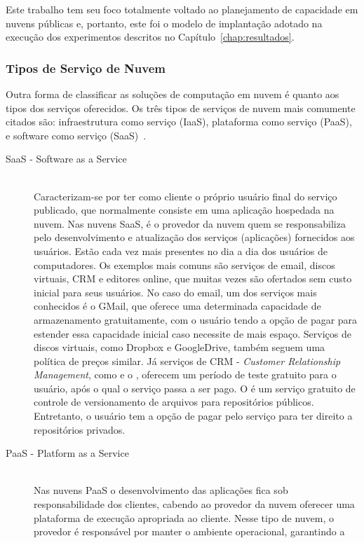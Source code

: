 Este trabalho tem seu foco totalmente voltado ao planejamento de capacidade em
nuvens públicas e, portanto, este foi o modelo de implantação adotado na execução
dos experimentos descritos no Capítulo~\ref{chap:resultados}. 

\subsubsection{Tipos de Serviço de Nuvem}
Outra forma de classificar as soluções de computação em nuvem é quanto aos tipos 
dos serviços oferecidos. Os três tipos de serviços de nuvem mais comumente citados 
são: infraestrutura como serviço (IaaS), plataforma como serviço (PaaS), e 
software como serviço (SaaS)~\cite{armbrust2010view,Zhang2010}. 

\begin{description}
\item[SaaS - Software as a Service] \hfill \\ Caracterizam-se por ter como cliente o
próprio usuário final do serviço publicado, que normalmente consiste em uma
aplicação hospedada na nuvem. Nas nuvens SaaS, é o provedor da nuvem quem se
responsabiliza pelo desenvolvimento e atualização dos serviços (aplicações) 
fornecidos aos usuários. Estão cada vez mais presentes no dia a dia dos usuários 
de computadores. Os exemplos mais comuns são serviços de email, discos virtuais, 
CRM e editores online, que muitas vezes são ofertados sem custo inicial para seus 
usuários. No caso do email, um dos serviços mais conhecidos é o GMail, que oferece 
uma determinada capacidade de armazenamento gratuitamente, com o usuário tendo a 
opção de pagar para estender essa capacidade inicial caso necessite de mais espaço. 
Serviços de discos virtuais, como Dropbox e GoogleDrive, também seguem uma política 
de preços similar. Já serviços de CRM - \emph{Customer Relationship Management}, 
como \cite{salesforce} e o \cite{zoho}, oferecem um período de teste gratuito 
para o usuário, após o qual o serviço passa a ser pago. O \cite{github} é um 
serviço gratuito de controle de versionamento de arquivos para repositórios 
públicos. Entretanto, o usuário tem a opção de pagar pelo serviço para ter direito 
a repositórios privados.
\item[PaaS - Platform as a Service] \hfill \\ Nas nuvens PaaS o desenvolvimento 
das aplicações fica sob responsabilidade dos clientes, cabendo ao provedor da 
nuvem oferecer uma plataforma de execução apropriada ao cliente. Nesse tipo de 
nuvem, o provedor é responsável por manter o ambiente operacional, garantindo a 

\end{description}

